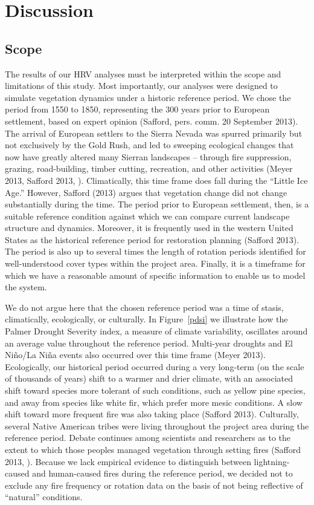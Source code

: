 \chapter{Discussion}
\section{Scope}
The results of our HRV analyses must be interpreted within the scope and limitations of this study. Most importantly, our analyses were designed to simulate vegetation dynamics under a historic reference period. We chose the period from 1550 to 1850, representing the 300 years prior to European settlement, based on expert opinion (Safford, pers. comm. 20 September 2013). The arrival of European settlers to the Sierra Nevada was spurred primarily but not exclusively by the Gold Rush, and led to sweeping ecological changes that now have greatly altered many Sierran landscapes -- through fire suppression, grazing, road-building, timber cutting, recreation, and other activities (Meyer 2013, Safford 2013, ). Climatically, this time frame does fall during the ``Little Ice Age.'' However, Safford (2013) argues that vegetation change did not change substantially during the time. The period prior to European settlement, then, is a suitable reference condition against which we can compare current landscape structure and dynamics. Moreover, it is frequently used in the western United States as the historical reference period for restoration planning (Safford 2013). The period is also up to several times the length of rotation periods identified for well-understood cover types within the project area. Finally, it is a timeframe for which we have a reasonable amount of specific information to enable us to model the system.

We do not argue here that the chosen reference period was a time of stasis, climatically, ecologically, or culturally. In Figure~\ref{pdsi} we illustrate how the Palmer Drought Severity index, a measure of climate variability, oscillates around an average value throughout the reference period. Multi-year droughts and El Niño/La Niña events also occurred over this time frame (Meyer 2013). Ecologically, our historical period occurred during a very long-term (on the scale of thousands of years) shift to a warmer and drier climate, with an associated shift toward species more tolerant of such conditions, such as yellow pine species, and away from species like white fir, which prefer more mesic conditions. A slow shift toward more frequent fire was also taking place (Safford 2013). Culturally, several Native American tribes were living throughout the project area during the reference period. Debate continues among scientists and researchers as to the extent to which those peoples managed vegetation through setting fires (Safford 2013, ). Because we lack empirical evidence to distinguish between lightning-caused and human-caused fires during the reference period, we decided not to exclude any fire frequency or rotation data on the basis of not being reflective of ``natural'' conditions.

